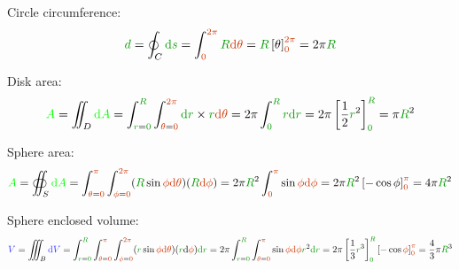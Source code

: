 Circle circumference:
\[
\dist{d}
= \oint_C \dist{\d s}
= \int_{\angle{0}}^{\angle{2\pi}} \dist{R} \angle{\d \theta}
= \dist{R} \left[ \theta \right]_{\angle{0}}^{\angle{2\pi}}
= 2\pi \dist{R}
\]

Disk area:
\[
\area{A}
= \iint_D \area{\d A}
= \int_{\dist{r}=\dist{0}}^{\dist{R}}
  \int_{\angle{\theta}=\angle{0}}^{\angle{2\pi}}
  \dist{\d r} \times \dist{r} \angle{\d \theta}
= 2\pi \int_{\dist{0}}^{\dist{R}} \dist{r} \dist{\d r}
= 2\pi \left[\frac 1 2 \dist{r}^2\right]_{\dist{0}}^{\dist{R}}
= \pi \dist{R}^2
\]

Sphere area:
\[
\area{A}
= \oiint_S \area{\d A}
= \int_{\angle{\theta}=\angle{0}}^{\angle{\pi}}
  \int_{\angle{\phi}=\angle{0}}^{\angle{2\pi}}
  (\dist{R} \sin \angle{\phi} \angle{\d \theta})
  (\dist{R} \angle{\d \phi})
= 2\pi \dist{R}^2 \int_{\angle{0}}^{\angle{\pi}} \sin \angle{\phi} \angle{\d \phi}
= 2\pi \dist{R}^2 \left[ - \cos \phi \right]_{\angle{0}}^{\angle{\pi}}
= 4\pi \dist{R}^2
\]

Sphere enclosed volume:
\[
\vol{V}
= \iiint_B \vol{\d V}
= \int_{\dist{r}=\dist{0}}^{\dist{R}}
  \int_{\angle{\theta}=\angle{0}}^{\angle{\pi}}
  \int_{\angle{\phi}=\angle{0}}^{\angle{2\pi}}
  (\dist{r} \sin \angle{\phi} \angle{\d \theta}) (\dist{r} \d \angle{\phi}) \dist{\d r}
= 2 \pi
  \int_{\dist{r}=\dist{0}}^{\dist{R}}
  \int_{\angle{\theta}=\angle{0}}^{\angle{\pi}} \sin \angle{\phi} \angle{\d \phi} \dist{r}^2 \dist{\d r}
= 2 \pi
  \left[\frac 1 3 \dist{r}^3\right]_{\dist{0}}^{\dist{R}}
  \left[- \cos \angle{\phi}\right]_{\angle{0}}^{\angle{\pi}}
= \frac 4 3 \pi \dist{R}^3
\]
